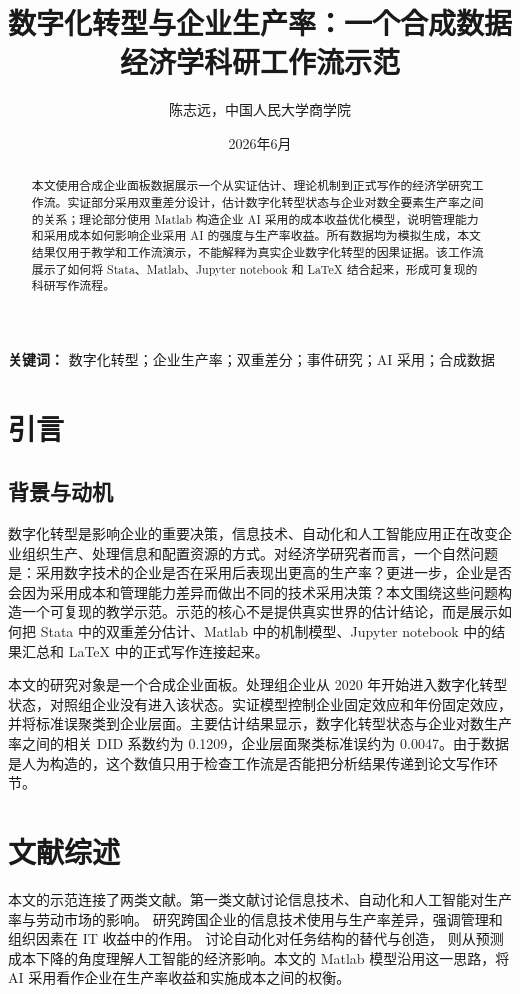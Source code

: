 \documentclass[11pt]{ctexart}
\title{数字化转型与企业生产率：一个合成数据经济学科研工作流示范}
\author{陈志远，中国人民大学商学院}
\date{2026年6月}
\begin{document}
\maketitle

\begin{abstract}
本文使用合成企业面板数据展示一个从实证估计、理论机制到正式写作的经济学研究工作流。实证部分采用双重差分设计，估计数字化转型状态与企业对数全要素生产率之间的关系；理论部分使用 Matlab 构造企业 AI 采用的成本收益优化模型，说明管理能力和采用成本如何影响企业采用 AI 的强度与生产率收益。所有数据均为模拟生成，本文结果仅用于教学和工作流演示，不能解释为真实企业数字化转型的因果证据。该工作流展示了如何将 Stata、Matlab、Jupyter notebook 和 \LaTeX{} 结合起来，形成可复现的科研写作流程。
\end{abstract}

\noindent\textbf{关键词：} 数字化转型；企业生产率；双重差分；事件研究；AI 采用；合成数据

\section{引言}
\subsection{背景与动机}

数字化转型是影响企业的重要决策，信息技术、自动化和人工智能应用正在改变企业组织生产、处理信息和配置资源的方式。对经济学研究者而言，一个自然问题是：采用数字技术的企业是否在采用后表现出更高的生产率？更进一步，企业是否会因为采用成本和管理能力差异而做出不同的技术采用决策？本文围绕这些问题构造一个可复现的教学示范。示范的核心不是提供真实世界的估计结论，而是展示如何把 Stata 中的双重差分估计、Matlab 中的机制模型、Jupyter notebook 中的结果汇总和 \LaTeX{} 中的正式写作连接起来。

本文的研究对象是一个合成企业面板。处理组企业从 2020 年开始进入数字化转型状态，对照组企业没有进入该状态。实证模型控制企业固定效应和年份固定效应，并将标准误聚类到企业层面。主要估计结果显示，数字化转型状态与企业对数生产率之间的相关 DID 系数约为 0.1209，企业层面聚类标准误约为 0.0047。由于数据是人为构造的，这个数值只用于检查工作流是否能把分析结果传递到论文写作环节。

\section{文献综述}

本文的示范连接了两类文献。第一类文献讨论信息技术、自动化和人工智能对生产率与劳动市场的影响。\citet{BloomSadunVanReenen2012} 研究跨国企业的信息技术使用与生产率差异，强调管理和组织因素在 IT 收益中的作用。\citet{AcemogluRestrepo2019} 讨论自动化对任务结构的替代与创造，\citet{AgrawalGansGoldfarb2019} 则从预测成本下降的角度理解人工智能的经济影响。本文的 Matlab 模型沿用这一思路，将 AI 采用看作企业在生产率收益和实施成本之间的权衡。
\end{document}
